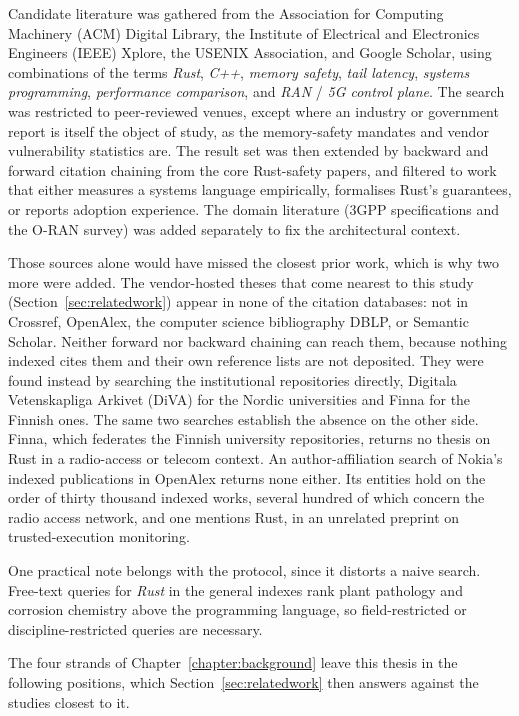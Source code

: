 \documentclass[english,oneside,a4paper,censored,csm,software-track-2020]{HYthesisML}
\begin{document}
\begin{appendices}
Candidate literature was gathered from the Association for Computing Machinery (ACM) Digital
Library, the Institute of Electrical and Electronics Engineers (IEEE) Xplore, the USENIX
Association, and Google Scholar, using combinations of the terms \emph{Rust}, \emph{C++}, \emph{memory safety}, \emph{tail
latency}, \emph{systems programming}, \emph{performance comparison}, and \emph{RAN} / \emph{5G
control plane}. The search was restricted to peer-reviewed venues, except where an industry or
government report is itself the object of study, as the memory-safety mandates and vendor
vulnerability statistics are.
The result set was then extended by backward and forward citation chaining from the core
Rust-safety papers, and filtered to work that either measures a systems language empirically,
formalises Rust's guarantees, or reports adoption experience. The domain literature (3GPP specifications and
the O-RAN survey) was added separately to fix the architectural context.

Those sources alone would have missed the closest prior work, which is why two more were added.
The vendor-hosted theses that come nearest to this study (Section~\ref{sec:relatedwork}) appear in
none of the citation databases: not in Crossref, OpenAlex, the computer science bibliography
DBLP, or Semantic Scholar. Neither
forward nor backward chaining can reach them, because nothing indexed cites them and their own
reference lists are not deposited. They were found instead by searching the institutional
repositories directly, Digitala Vetenskapliga Arkivet (DiVA) for the Nordic universities and
Finna for the Finnish ones. The same
two searches establish the absence on the other side. Finna, which federates the Finnish
university repositories, returns no thesis on Rust in a radio-access or telecom context. An
author-affiliation search of Nokia's indexed publications in OpenAlex returns none either. Its
entities hold on the order of thirty thousand indexed works, several hundred of which concern the
radio access network, and one mentions Rust, in an unrelated preprint on trusted-execution
monitoring.

One practical note belongs with the protocol, since it distorts a naive search. Free-text queries
for \emph{Rust} in the general indexes rank plant pathology and corrosion chemistry above the
programming language, so field-restricted or discipline-restricted queries are necessary.

The four strands of Chapter~\ref{chapter:background} leave this thesis in the following
positions, which Section~\ref{sec:relatedwork} then answers against the studies closest to it.


\end{appendices}
\end{document}
